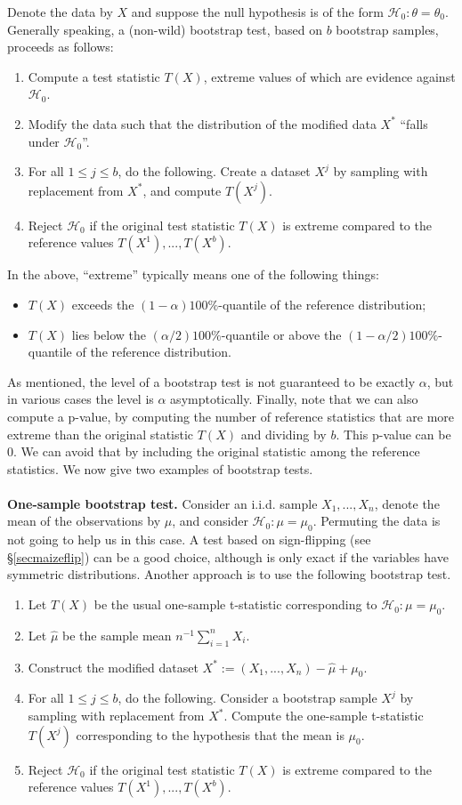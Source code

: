 \documentclass[11pt]{article}
\theoremstyle{plain}
\theoremstyle{definition}
\newcommand{\Hy}{\mathcal{H}}
\begin{document}
Denote the data by $X$ and suppose the null hypothesis is of the form $\Hy_0:\theta=\theta_0$. Generally speaking, a (non-wild) bootstrap test, based on $b$ bootstrap samples, proceeds as follows:
\begin{enumerate}
\item Compute a test statistic $T(X)$, extreme  values of which are evidence against $\Hy_0$.
\item Modify the data such that the distribution of the modified data $X^*$ ``falls under $\Hy_0$''.
\item For all $1\leq j \leq b$, do the following. Create a dataset $X^j$ by sampling with replacement from $X^*$, and compute $T(X^j)$.
\item Reject $\Hy_0$ if the original test statistic $T(X)$ is extreme compared to the reference values $T(X^1),...,T(X^b)$.
\end{enumerate}
In the above, ``extreme'' typically means one of the following things:
\begin{itemize} 
\item $T(X)$ exceeds the $(1-\alpha)100\%$-quantile of the reference distribution;
\item $T(X)$ lies below the $(\alpha/2)100\%$-quantile or above the $(1-\alpha/2)100\%$-quantile of the reference distribution.
\end{itemize}
As mentioned, the level of a bootstrap test is not guaranteed to be exactly $\alpha$, but in various cases the level is $\alpha$ asymptotically. Finally, note that we can also compute a p-value, by computing the number of reference statistics that are more extreme than the original statistic $T(X)$ and dividing by $b$. This p-value can be 0. We can avoid that by including the original statistic among the reference statistics. We now give two examples of bootstrap tests.
\\
\\
\textbf{One-sample bootstrap test.}
Consider an i.i.d. sample $X_1,...,X_n$, denote the mean of the observations by $\mu$, and consider $\Hy_0:\mu=\mu_0$. Permuting the data is not going to help us in this case. A test based on sign-flipping (see \S\ref{secmaizeflip}) can be a good choice, although is only exact if the variables have  symmetric distributions.
Another approach is to use the following bootstrap test.
\begin{enumerate}
\item Let $T(X)$ be the usual one-sample t-statistic corresponding to  $\Hy_0:\mu=\mu_0$.
\item Let $\hat{\mu}$ be the sample mean $n^{-1}\sum_{i=1}^n X_i$.
\item Construct the  modified dataset $X^*:=(X_1,...,X_n) - \hat{\mu} + \mu_0$.
\item For all $1\leq j \leq b$, do the following. Consider a bootstrap sample $X^j$ by sampling with replacement from $X^*$. Compute the one-sample t-statistic $T(X^j)$ corresponding to the hypothesis that the mean is $\mu_0$.
\item Reject $\Hy_0$ if the original test statistic $T(X)$ is extreme compared to the reference values $T(X^1),...,T(X^b)$.
\end{enumerate} \phantom{.}
\end{document}
